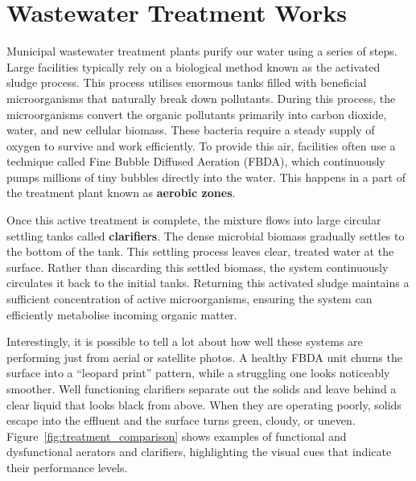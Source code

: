 \label{chap:background}

\section{Wastewater Treatment Works}
Municipal wastewater treatment plants purify our water using a series of steps. Large facilities typically rely on a biological method known as the activated sludge process. This process utilises enormous tanks filled with beneficial microorganisms that naturally break down pollutants. During this process, the microorganisms convert the organic pollutants primarily into carbon dioxide, water, and new cellular biomass. These bacteria require a steady supply of oxygen to survive and work efficiently. To provide this air, facilities often use a technique called Fine Bubble Diffused Aeration (FBDA), which continuously pumps millions of tiny bubbles directly into the water. This happens in a part of the treatment plant known as \textbf{aerobic zones}.

Once this active treatment is complete, the mixture flows into large circular settling tanks called \textbf{clarifiers}. The dense microbial biomass gradually settles to the bottom of the tank. This settling process leaves clear, treated water at the surface. Rather than discarding this settled biomass, the system continuously circulates it back to the initial tanks. Returning this activated sludge maintains a sufficient concentration of active microorganisms, ensuring the system can efficiently metabolise incoming organic matter.

Interestingly, it is possible to tell a lot about how well these systems are performing just from aerial or satellite photos. A healthy FBDA unit churns the surface into a ``leopard print'' pattern, while a struggling one looks noticeably smoother. Well functioning clarifiers separate out the solids and leave behind a clear liquid that looks black from above. When they are operating poorly, solids escape into the effluent and the surface turns green, cloudy, or uneven. Figure~\ref{fig:treatment_comparison} shows examples of functional and dysfunctional aerators and clarifiers, highlighting the visual cues that indicate their performance levels.

